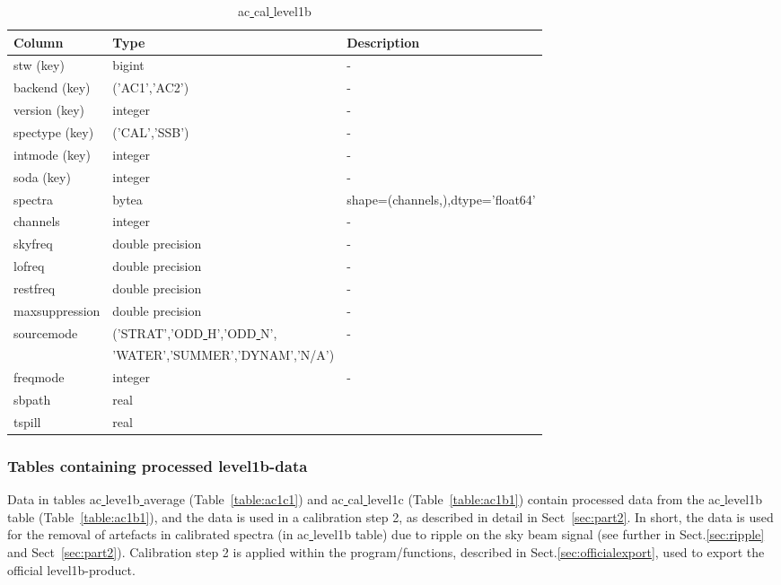 \documentclass[12pt]{article}
\begin{document}
\begin{table}
\begin{tiny}
   \begin{subtable}{.9\linewidth}
      \captionsetup{font=scriptsize}
      \centering
\caption{ac\underline{ }cal\underline{ }level1b}
\label{table:ac1b12}
        \begin{tabular}{l l l}
\hline\hline
Column & Type & Description \\ [0.5ex]
\hline
 stw (key)           & bigint            &- \\
 backend (key)       & ('AC1','AC2')     & -\\
 version (key)       & integer           & -\\
 spectype (key)      & ('CAL','SSB')         & -\\
 intmode (key)       & integer           & -\\
 soda (key)       & integer           & -\\
 spectra        & bytea             & shape=(channels,),dtype='float64'\\
 channels       & integer           & -\\
 skyfreq        & double precision  & -\\
 lofreq         & double precision  & -\\
 restfreq       & double precision  & -\\
 maxsuppression & double precision  & -\\
 sourcemode     & ('STRAT','ODD\underline{ }H','ODD\underline{ }N', & -\\
& 'WATER','SUMMER','DYNAM','N/A')   & \\
 freqmode       & integer           & -\\ 
 sbpath         & real              &\\
 tspill         & real              &\\[1ex]
\hline
\end{tabular}
\end{subtable}
\end{tiny}
\end{table}

\clearpage
\newpage

\subsubsection{Tables containing processed level1b-data}
\label{sec:level1c}
Data in tables ac\underline{ }leve1b\underline{ }average 
(Table~\ref{table:ac1c1})
and ac\underline{ }cal\underline{ }level1c (Table~\ref{table:ac1b1})
contain processed data from the ac\underline{ }level1b table
(Table~\ref{table:ac1b1}), and the data is used in a calibration
step 2, as described in detail in Sect~\ref{sec:part2}.
In short, the data is used for the removal
of artefacts in calibrated spectra (in ac\underline{ }level1b table) 
due to ripple on the sky beam signal
(see further in Sect.\ref{sec:ripple} and Sect~\ref{sec:part2}).
Calibration step 2 is applied within the program/functions, described in
Sect.\ref{sec:officialexport}, used to export the official
level1b-product.
\end{document}
